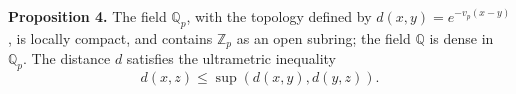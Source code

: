 \textbf{Proposition 4.} The field $\mathbb{Q}_p$, with the topology defined by $d(x, y) = e^{-v_p(x-y)}$, is locally compact, and contains $\mathbb{Z}_p$ as an open subring; the field $\mathbb{Q}$ is dense in $\mathbb{Q}_p$. The distance $d$ satisfies the ultrametric inequality
$$d(x, z) \leq \sup(d(x, y), d(y, z)).$$
